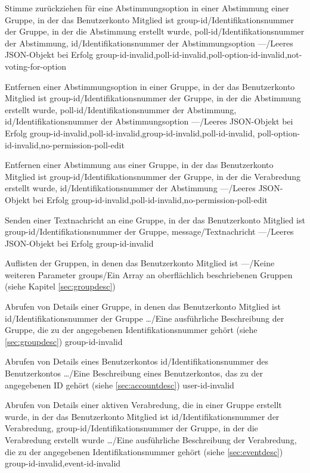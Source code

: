 \documentclass[parskip=full,11pt]{scrartcl}
\begin{document}
{Stimme zurückziehen für eine Abstimmungsoption in einer Abstimmung
einer Gruppe, in der das Benutzerkonto Mitglied ist}
{group-id/Identifikationsnummer der Gruppe{,} in der die Abstimmung erstellt
wurde,
poll-id/Identifikationsnummer der Abstimmung,
id/Identifikationsnummer der Abstimmungsoption}
{---/Leeres JSON-Objekt bei Erfolg}
{group-id-invalid,poll-id-invalid,poll-option-id-invalid,not-voting-for-option}

{Entfernen einer Abstimmungsoption in einer Gruppe, in der das Benutzerkonto
Mitglied ist}
{group-id/Identifikationsnummer der Gruppe{,} in der die Abstimmung erstellt
wurde,
poll-id/Identifikationsnummer der Abstimmung,
id/Identifikationsnummer der Abstimmungsoption}
{---/Leeres JSON-Objekt bei Erfolg}
{group-id-invalid,poll-id-invalid,group-id-invalid,poll-id-invalid,
poll-option-id-invalid,no-permission-poll-edit}

{Entfernen einer Abstimmung aus einer Gruppe, in der das Benutzerkonto Mitglied
ist}
{group-id/Identifikationsnummer der Gruppe{,} in der die Verabredung erstellt
wurde,
id/Identifikationsnummer der Abstimmung}
{---/Leeres JSON-Objekt bei Erfolg}
{group-id-invalid,poll-id-invalid,no-permission-poll-edit}

{Senden einer Textnachricht an eine Gruppe, in der das Benutzerkonto Mitglied
ist}
{group-id/Identifikationsnummer der Gruppe,
message/Textnachricht} %
{---/Leeres JSON-Objekt bei Erfolg}
{group-id-invalid}

{Auflisten der Gruppen, in denen das Benutzerkonto Mitglied ist}
{---/Keine weiteren Parameter}
{groups/Ein Array an oberflächlich beschriebenen Gruppen (siehe
Kapitel \ref{sec:groupdesc})}
{}

{Abrufen von Details einer Gruppe, in denen das Benutzerkonto Mitglied ist}
{id/Identifikationsnummer der Gruppe}
{\dots/Eine ausführliche Beschreibung der Gruppe{,} die zu der angegebenen
Identifikationsnummer gehört (siehe \ref{sec:groupdesc})}
{group-id-invalid}

{Abrufen von Details eines Benutzerkontos}
{id/Identifikationsnummer des Benutzerkontos}
{\dots/Eine Beschreibung eines Benutzerkontos{,} das zu der angegebenen
ID gehört (siehe \ref{sec:accountdesc})}
{user-id-invalid}

{Abrufen von Details einer aktiven Verabredung, die in einer Gruppe erstellt
wurde, in der das Benutzerkonto Mitglied ist}
{id/Identifikationsnummer der Verabredung,
group-id/Identifikationsnummer der Gruppe{,} in der die Verabredung erstellt
wurde}
{\dots/Eine ausführliche Beschreibung der Verabredung{,} die zu der angegebenen
Identifikationsnummer gehört (siehe \ref{sec:eventdesc})}
{group-id-invalid,event-id-invalid}
\end{document}
